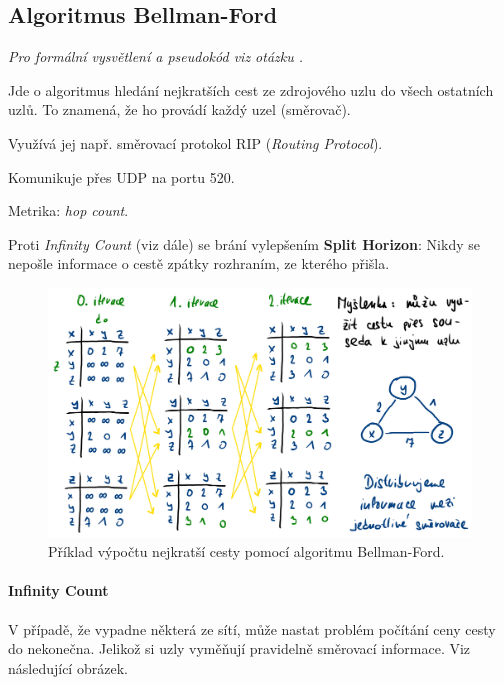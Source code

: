 \subsection{Algoritmus Bellman-Ford}

\begin{compactitem}
    \item \textit{Pro formální vysvětlení a pseudokód viz otázku .}
    \item Jde o algoritmus hledání nejkratších cest ze zdrojového uzlu do všech ostatních uzlů. To znamená, že ho provádí každý uzel (směrovač).
    \item Využívá jej např. směrovací protokol RIP (\textit{Routing Protocol}). \begin{compactitem}
        \item Komunikuje přes UDP na portu 520.
        \item Metrika: \textit{hop count}.
        \item Proti \textit{Infinity Count} (viz dále) se brání vylepšením \textbf{Split Horizon}: Nikdy se nepošle informace o cestě zpátky rozhraním, ze kterého přišla.
    \end{compactitem}
\end{compactitem}

\begin{figure}[H]
    \centering
    \includegraphics[width=1\linewidth]{bellman_ford_example.pdf}
    \caption{Příklad výpočtu nejkratší cesty pomocí algoritmu Bellman-Ford.}
\end{figure}

\paragraph*{Infinity Count} V případě, že vypadne některá ze sítí, může nastat problém počítání ceny cesty do nekonečna. Jelikož si uzly vyměňují pravidelně směrovací informace. Viz následující obrázek.

